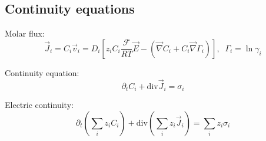\documentclass[aps,12pt]{revtex4}
\begin{document}
\subsection{Continuity equations}

Molar flux:
\begin{equation}
	\vec{J}_i = C_i \vec{v}_i = D_i \left[z_i C_i  \dfrac{\mathcal{F}}{RT} \vec{E} - \left(\vec{\nabla} C_i + C_i \vec{\nabla}\Gamma_i\right) \right],\;\;\Gamma_i = \ln \gamma_i
\end{equation}

Continuity equation:
\begin{equation}
	\partial_t C_i + \mathrm{div} \vec{J}_i = \sigma_i
\end{equation}

Electric continuity:
\begin{equation}
	\partial_t \left(\sum_i z_i C_i\right) + \mathrm{div} \left(\sum_i z_i \vec{J}_i\right) = \sum_i z_i \sigma_i
\end{equation}
\end{document}
